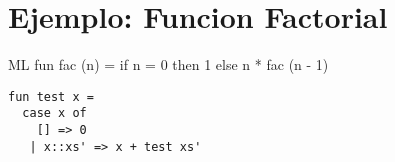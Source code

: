 \documentclass[11pt]{article} %
\begin{document}
\section{\color{red}Ejemplo: Funcion Factorial}

ML
fun fac (n) =
if n = 0 then 1
else n * fac (n - 1)


\lstset{language=ML}          %

\begin{lstlisting}[frame=single]  % Start your code-block
fun test x =
  case x of
    [] => 0
   | x::xs' => x + test xs'
\end{lstlisting}
\end{document}
